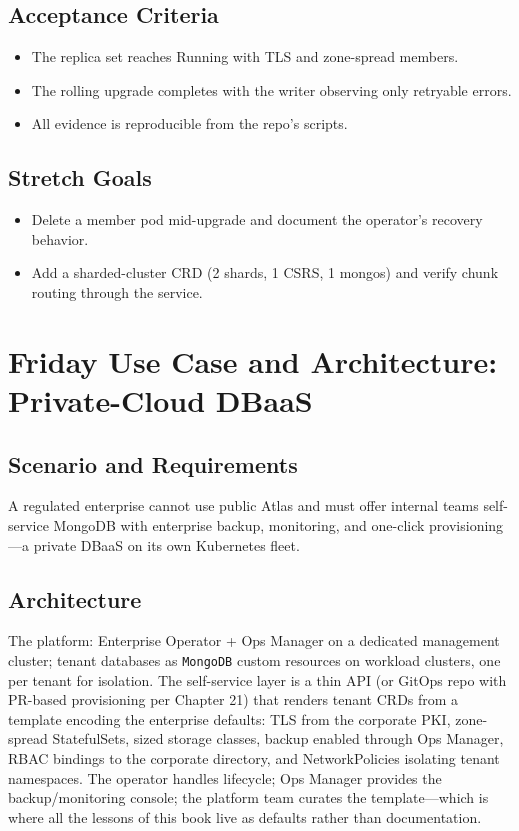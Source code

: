 \subsection*{Acceptance Criteria}
\begin{itemize}
    \item The replica set reaches Running with TLS and zone-spread members.
    \item The rolling upgrade completes with the writer observing only retryable errors.
    \item All evidence is reproducible from the repo's scripts.
\end{itemize}

\subsection*{Stretch Goals}
\begin{itemize}
    \item Delete a member pod mid-upgrade and document the operator's recovery behavior.
    \item Add a sharded-cluster CRD (2 shards, 1 CSRS, 1 mongos) and verify chunk routing through the service.
\end{itemize}

\section{Friday Use Case and Architecture: Private-Cloud DBaaS}
\subsection{Scenario and Requirements}
A regulated enterprise cannot use public Atlas and must offer internal teams self-service MongoDB with enterprise backup, monitoring, and one-click provisioning---a private DBaaS on its own Kubernetes fleet.

\subsection{Architecture}
The platform: Enterprise Operator + Ops Manager on a dedicated management cluster; tenant databases as \texttt{MongoDB} custom resources on workload clusters, one per tenant for isolation. The self-service layer is a thin API (or GitOps repo with PR-based provisioning per Chapter 21) that renders tenant CRDs from a template encoding the enterprise defaults: TLS from the corporate PKI, zone-spread StatefulSets, sized storage classes, backup enabled through Ops Manager, RBAC bindings to the corporate directory, and NetworkPolicies isolating tenant namespaces. The operator handles lifecycle; Ops Manager provides the backup/monitoring console; the platform team curates the template---which is where all the lessons of this book live as defaults rather than documentation.


